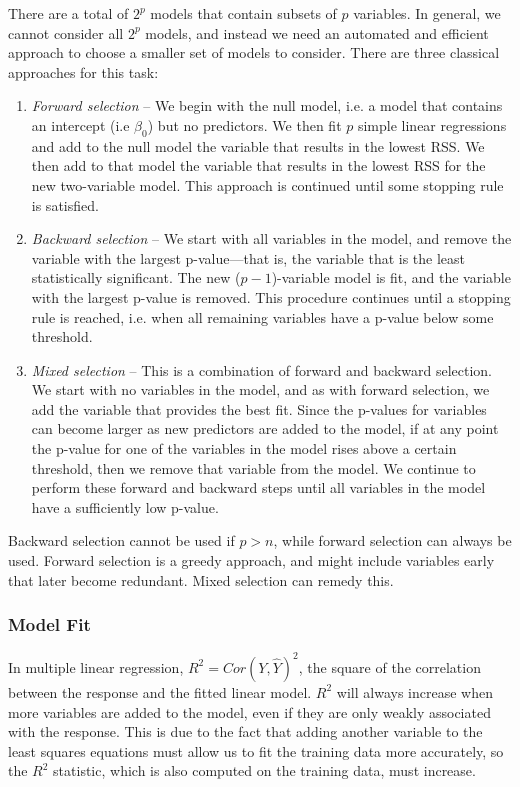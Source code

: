 \documentclass{article}
\numberwithin{equation}{section}
\begin{document}
There are a total of $2^p$ models that contain subsets of $p$ variables. In general, we cannot consider all $2^p$ models, and instead we need an automated and efficient approach to choose a smaller set of models to consider. There
are three classical approaches for this task:
\begin{enumerate}
    \item \textit{Forward selection} -- We begin with the null model, i.e. a model that contains an intercept (i.e $\beta_0$) but no predictors. We then fit $p$ simple linear regressions and add to the null model the variable that results in the lowest RSS. We then add to that model the variable that results in the lowest RSS for the new two-variable model. This approach is continued until some stopping rule is satisfied.
    
    \item \textit{Backward selection} -- We start with all variables in the model, and remove the variable with the largest p-value—that is, the variable  that is the least statistically significant. The new ($p - 1$)-variable model is fit, and the variable with the largest p-value is removed. This procedure continues until a stopping rule is reached, i.e. when  all remaining variables have a p-value below some threshold.
    
    \item \textit{Mixed selection} -- This is a combination of forward and backward selection. We start with no variables in the model, and as with forward selection, we add the variable that provides the best fit. Since the p-values for variables can become larger as new predictors are added to the model, if at any point the p-value for one of the variables in the model rises above a certain threshold, then we remove that variable from the model. We continue to perform these forward and backward steps until all variables in the model have a sufficiently low p-value.
\end{enumerate}

Backward selection cannot be used if $p>n$, while forward selection can
always be used. Forward selection is a greedy approach, and might include
variables early that later become redundant. Mixed selection can remedy
this.

\subsubsection*{Model Fit}
In multiple linear regression, $R^2 =  Cor(Y, \hat Y)^2$,  the square of the correlation between the response and the fitted linear model. $R^2$ will always increase when more variables are added to the model, even if they are only weakly associated with the response.  This is due to the fact that adding another variable to the least squares equations must allow us to fit the training data more accurately, so the $R^2$ statistic, which is also computed on the training data, must increase.
\end{document}
